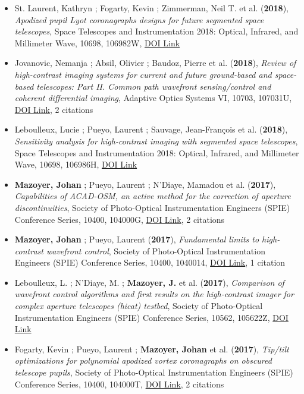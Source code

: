 \documentclass[11pt]{article}
\begin{document}
\begin{itemize}
\item St. Laurent, Kathryn ; Fogarty, Kevin ; Zimmerman, Neil T. et al. ({\bf2018}), {\it Apodized pupil Lyot coronagraphs designs for future segmented space telescopes}, Space Telescopes and Instrumentation 2018: Optical, Infrared, and Millimeter Wave, 10698, 106982W, \href{https://doi.org/10.1117/12.2313902}{DOI Link}

\item Jovanovic, Nemanja ; Absil, Olivier ; Baudoz, Pierre et al. ({\bf2018}), {\it Review of high-contrast imaging systems for current and future ground-based and space-based telescopes: Part II. Common path wavefront sensing/control and coherent differential imaging}, Adaptive Optics Systems VI, 10703, 107031U, \href{https://doi.org/10.1117/12.2314260}{DOI Link}, 2 citations

\item Leboulleux, Lucie ; Pueyo, Laurent ; Sauvage, Jean-Fran{\c{c}}ois et al. ({\bf2018}), {\it Sensitivity analysis for high-contrast imaging with segmented space telescopes}, Space Telescopes and Instrumentation 2018: Optical, Infrared, and Millimeter Wave, 10698, 106986H, \href{https://doi.org/10.1117/12.2313904}{DOI Link}

\item {\bf Mazoyer, Johan} ; Pueyo, Laurent ; N'Diaye, Mamadou et al. ({\bf2017}), {\it Capabilities of ACAD-OSM, an active method for the correction of aperture discontinuities}, Society of Photo-Optical Instrumentation Engineers (SPIE) Conference Series, 10400, 104000G, \href{https://doi.org/10.1117/12.2273070}{DOI Link}, 2 citations

\item {\bf Mazoyer, Johan} ; Pueyo, Laurent ({\bf2017}), {\it Fundamental limits to high-contrast wavefront control}, Society of Photo-Optical Instrumentation Engineers (SPIE) Conference Series, 10400, 1040014, \href{https://doi.org/10.1117/12.2274657}{DOI Link}, 1 citation

\item Leboulleux, L. ; N'Diaye, M. ; {\bf Mazoyer, J.} et al. ({\bf2017}), {\it Comparison of wavefront control algorithms and first results on the high-contrast imager for complex aperture telescopes (hicat) testbed}, Society of Photo-Optical Instrumentation Engineers (SPIE) Conference Series, 10562, 105622Z, \href{https://doi.org/10.1117/12.2296154}{DOI Link}

\item Fogarty, Kevin ; Pueyo, Laurent ; {\bf Mazoyer, Johan} et al. ({\bf2017}), {\it Tip/tilt optimizations for polynomial apodized vortex coronagraphs on obscured telescope pupils}, Society of Photo-Optical Instrumentation Engineers (SPIE) Conference Series, 10400, 104000T, \href{https://doi.org/10.1117/12.2274603}{DOI Link}, 2 citations


\end{itemize}
\end{document}
